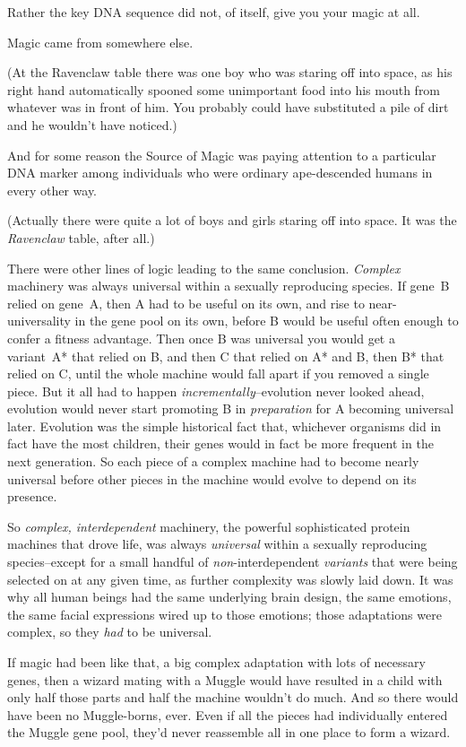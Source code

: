 Rather the key DNA sequence did not, of itself, give you your magic at all.

Magic came from somewhere else.

(At the Ravenclaw table there was one boy who was staring off into space, as his right hand automatically spooned some unimportant food into his mouth from whatever was in front of him. You probably could have substituted a pile of dirt and he wouldn't have noticed.)

And for some reason the Source of Magic was paying attention to a particular DNA marker among individuals who were ordinary ape-descended humans in every other way.

(Actually there were quite a lot of boys and girls staring off into space. It was the \emph{Ravenclaw} table, after all.)

There were other lines of logic leading to the same conclusion. \emph{Complex} machinery was always universal within a sexually reproducing species. If gene~B relied on gene~A, then A had to be useful on its own, and rise to near-universality in the gene pool on its own, before B would be useful often enough to confer a fitness advantage. Then once B was universal you would get a variant~A* that relied on B, and then C that relied on A* and B, then B* that relied on C, until the whole machine would fall apart if you removed a single piece. But it all had to happen \emph{incrementally}\---evolution never looked ahead, evolution would never start promoting B in \emph{preparation} for A becoming universal later. Evolution was the simple historical fact that, whichever organisms did in fact have the most children, their genes would in fact be more frequent in the next generation. So each piece of a complex machine had to become nearly universal before other pieces in the machine would evolve to depend on its presence.

So \emph{complex, interdependent} machinery, the powerful sophisticated protein machines that drove life, was always \emph{universal} within a sexually reproducing species\---except for a small handful of \emph{non}-interdependent \emph{variants} that were being selected on at any given time, as further complexity was slowly laid down. It was why all human beings had the same underlying brain design, the same emotions, the same facial expressions wired up to those emotions; those adaptations were complex, so they \emph{had} to be universal.

If magic had been like that, a big complex adaptation with lots of necessary genes, then a wizard mating with a Muggle would have resulted in a child with only half those parts and half the machine wouldn't do much. And so there would have been no Muggle-borns, ever. Even if all the pieces had individually entered the Muggle gene pool, they'd never reassemble all in one place to form a wizard.

